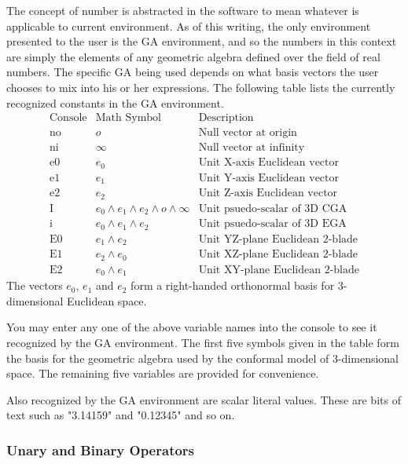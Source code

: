\documentclass[12pt]{article}
\newcommand{\nvao}{o}
\newcommand{\nvai}{\infty}
\begin{document}
The concept of number is abstracted in the software to mean whatever is applicable
to current environment.  As of this writing, the only environment presented to the
user is the GA environment, and so the numbers in this context are simply the elements
of any geometric algebra defined over the field of real numbers.  The specific GA being
used depends on what basis vectors the user chooses to mix into his or her
expressions.  The following table lists the currently recognized constants in the
GA environment.
\begin{equation*}
\begin{array}{ccl}
\mbox{Console} & \mbox{Math Symbol} & \mbox{Description} \\
\hline
\mbox{no} & \nvao & \mbox{Null vector at origin} \\
\mbox{ni} & \nvai & \mbox{Null vector at infinity} \\
\mbox{e0} & e_0 & \mbox{Unit X-axis Euclidean vector} \\
\mbox{e1} & e_1 & \mbox{Unit Y-axis Euclidean vector} \\
\mbox{e2} & e_2 & \mbox{Unit Z-axis Euclidean vector} \\
\mbox{I} & e_0\wedge e_1\wedge e_2\wedge \nvao\wedge \nvai & \mbox{Unit psuedo-scalar of 3D CGA} \\
\mbox{i} & e_0\wedge e_1\wedge e_2 & \mbox{Unit psuedo-scalar of 3D EGA} \\
\mbox{E0} & e_1\wedge e_2 & \mbox{Unit YZ-plane Euclidean 2-blade} \\
\mbox{E1} & e_2\wedge e_0 & \mbox{Unit XZ-plane Euclidean 2-blade} \\
\mbox{E2} & e_0\wedge e_1 & \mbox{Unit XY-plane Euclidean 2-blade}
\end{array}
\end{equation*}
The vectors $e_0$, $e_1$ and $e_2$ form a right-handed orthonormal basis for 3-dimensional
Euclidean space.

You may enter any one of the above variable names into the console to see it recognized
by the GA environment.  The first five symbols given in the table form the basis for the
geometric algebra used by the conformal model of 3-dimensional space.  The remaining
five variables are provided for convenience.

Also recognized by the GA environment are scalar literal values.  These are bits of
text such as "3.14159" and "0.12345" and so on.

\subsubsection{Unary and Binary Operators}
\end{document}
